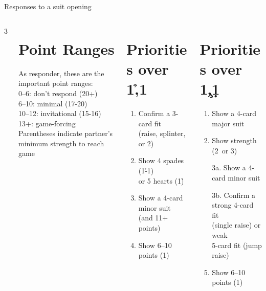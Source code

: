 \begin{sheet}{Responses to a suit opening}
\setcounter{section}{0}

\begin{columns}3

\begin{column}
  \section{Point Ranges}
  As responder, these are the important point ranges:\\
  0--6: don't respond (20+)\\
  6--10: minimal (17-20)\\
  10--12: invitational (15-16)\\
  13+: game-forcing\\
  Parentheses indicate partner's minimum strength to reach game
\end{column}

\begin{column}
\section{Priorities over 1\h,1\s}
\begin{enumerate}\itemsep-4pt
  \item Confirm a 3-card fit\\ (raise, splinter, or 2\nt)
  \item Show 4 spades (1\h-1\s)\\ or 5 hearts (1\h)
  \item Show a 4-card minor suit\\ (and 11+ points)
  \item Show 6--10 points (1\nt)
\end{enumerate}
\end{column}

\begin{column}
\section{Priorities over 1\c,1\d}
\begin{enumerate}\itemsep-4pt
  \item Show a 4-card major suit
  \item Show strength (2\nt\ or 3\nt)
  \item[3a.] Show a 4-card minor suit
  \item[3b.] Confirm a strong 4-card fit\\
    (single raise) or weak\\ 5-card fit
    (jump raise)
  \item Show 6--10 points (1\nt)
\end{enumerate}
\end{column}


\end{columns}
\end{sheet}
